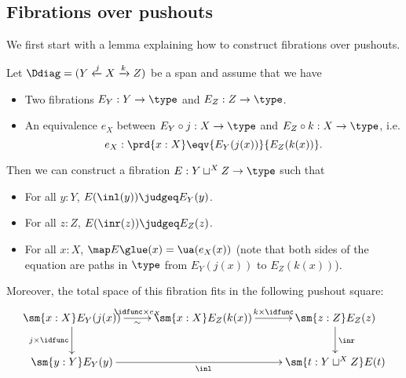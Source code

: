 {\subsection{Fibrations over pushouts}
\label{sec:fib-over-pushout}

We first start with a lemma explaining how to construct fibrations over
pushouts.
%

\begin{lem}\label{lem:fibration-over-pushout}
  Let $\Ddiag=(Y\xleftarrow{j}X\xrightarrow{k}Z)$ be a span and assume
  that we have
  \begin{itemize}
  \item Two fibrations $E_Y:Y\to\type$ and $E_Z:Z\to\type$.
  \item An equivalence $e_X$ between $E_Y\circ j:X\to\type$ and $E_Z\circ
    k:X\to\type$, i.e.
    \[e_X:\prd{x:X}\eqv{E_Y(j(x))}{E_Z(k(x))}.\]
  \end{itemize}

  Then we can construct a fibration $E:Y\sqcup^XZ\to\type$ such that
  \begin{itemize}
  \item For all $y:Y$, $E(\inl(y))\judgeq E_Y(y)$.
  \item For all $z:Z$, $E(\inr(z))\judgeq E_Z(z)$.
  \item For all $x:X$, $\map E{\glue(x)}=\ua(e_X(x))$ (note that both sides of
    the equation are paths in $\type$ from $E_Y(j(x))$ to $E_Z(k(x))$).
  \end{itemize}
  Moreover, the total space of this fibration fits in the following pushout
  square:
  \[\xymatrix{ \sm{x:X}E_Y(j(x)) \ar[r]_\sim^{\idfunc\times e_X}
    \ar[d]_{j\times\idfunc} &
    \sm{x:X}E_Z(k(x)) \ar[r]^-{k\times\idfunc}
    & \sm{z:Z}E_Z(z) \ar[d]^\inr \\
    \sm{y:Y}E_Y(y) \ar[rr]_\inl & & \sm{t:Y\sqcup^XZ}E(t) }\]
\end{lem}

}

